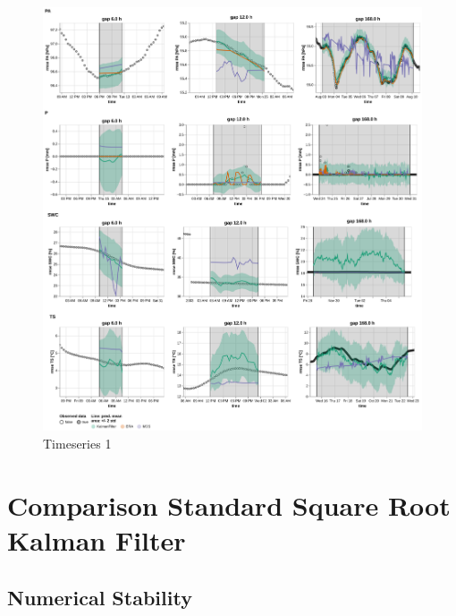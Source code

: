 \documentclass{article}
\newcommand{\imgwidth}{6in}
\let\Oldsection\section
\renewcommand{\section}{\FloatBarrier\Oldsection}
\let\Oldsubsection\subsection
\renewcommand{\subsection}{\FloatBarrier\Oldsubsection}
\begin{document}
\begin{figure}
\centerline{\includegraphics[width=\imgwidth]{timeseries_2_2}}
\caption{Timeseries 1}
\label{fig:ts_2_2}
\end{figure}

\section{Comparison Standard Square Root Kalman Filter}

\subsection{Numerical Stability}
\end{document}
